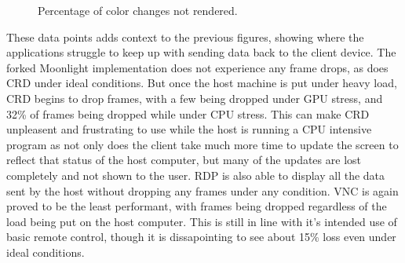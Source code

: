 \begin{figure}[h]
  \centering
  \caption[Color Delay Loss Data]{Percentage of color changes not rendered.}
  \label{fig:ColorDelayLoss}
\end{figure}

These data points adds context to the previous figures, showing where the applications struggle to keep up with sending data back to the client device.
The forked Moonlight implementation does not experience any frame drops, as does CRD under ideal conditions.
But once the host machine is put under heavy load, CRD begins to drop frames, with a few being dropped under GPU stress, and 32\% of frames being dropped while under CPU stress.
This can make CRD unpleasent and frustrating to use while the host is running a CPU intensive program as not only does the client take much more time to update the screen to reflect that status of the host computer, but many of the updates are lost completely and not shown to the user.
RDP is also able to display all the data sent by the host without dropping any frames under any condition.
VNC is again proved to be the least performant, with frames being dropped regardless of the load being put on the host computer.
This is still in line with it's intended use of basic remote control, though it is dissapointing to see about 15\% loss even under ideal conditions.


